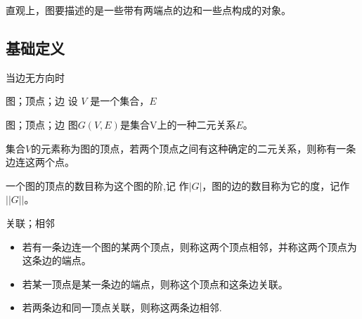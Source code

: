\begin{issues}
\issueTODO
\end{issues}
直观上，图要描述的是一些带有两端点的边和一些点构成的对象。
\subsection{基础定义}
当边无方向时

\begin{definition}{图；顶点；边}
设 $V$ 是一个集合，$E$ 
\end{definition}



\begin{definition}{图；顶点；边}
图$G(V,E)$是集合V上的一种二元关系$E$。

集合$V$的元素称为图的顶点，若两个顶点之间有这种确定的二元关系，则称有一条边连这两个点。

一个图的顶点的数目称为这个图的阶,记 作$|G|$，图的边的数目称为它的度，记作$||G||$。
\end{definition}
\begin{definition}{关联；相邻}
\begin{itemize}
\item 若有一条边连一个图的某两个顶点，则称这两个顶点相邻，并称这两个顶点为这条边的端点。
\item 若某一顶点是某一条边的端点，则称这个顶点和这条边关联。
\item 若两条边和同一顶点关联，则称这两条边相邻.
\end{itemize}
\end{definition}

